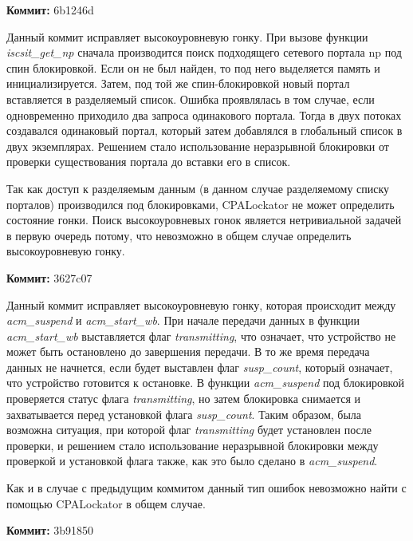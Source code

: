 \vspace{1cm}

\textbf{Коммит:} 6b1246d

Данный коммит исправляет высокоуровневую гонку.
При вызове функции \textit{iscsit\_get\_np} сначала производится поиск подходящего сетевого портала np под спин блокировкой.
Если он не был найден, то под него выделяется память и инициализируется.
Затем, под той же спин-блокировкой новый портал вставляется в разделяемый список.
Ошибка проявлялась в том случае, если одновременно приходило два запроса одинакового портала.
Тогда в двух потоках создавался одинаковый портал, который затем добавлялся в глобальный список в двух экземплярах.
Решением стало использование неразрывной блокировки от проверки существования портала до вставки его в список.

Так как доступ к разделяемым данным (в данном случае разделяемому списку порталов) производился под блокировками, CPALockator не может определить состояние гонки.
Поиск высокоуровневых гонок является нетривиальной задачей в первую очередь потому, что невозможно в общем случае определить высокоуровневую гонку.

\vspace{1cm}

\textbf{Коммит:} 3627c07

Данный коммит исправляет высокоуровневую гонку, которая происходит между \textit{acm\_suspend} и \textit{acm\_start\_wb}.
При начале передачи данных в функции \textit{acm\_start\_wb} выставляется флаг \textit{transmitting}, что означает, что устройство не может быть остановлено до завершения передачи.
В то же время передача данных не начнется, если будет выставлен флаг \textit{susp\_count}, который означает, что устройство готовится к остановке.
В функции \textit{acm\_suspend} под блокировкой проверяется статус флага \textit{transmitting}, но затем блокировка снимается и захватывается перед установкой флага \textit{susp\_count}.
Таким образом, была возможна ситуация, при которой флаг \textit{transmitting} будет установлен после проверки, и решением стало использование неразрывной блокировки между проверкой и установкой флага также, как это было сделано в \textit{acm\_suspend}.

Как и в случае с предыдущим коммитом данный тип ошибок невозможно найти с помощью CPALockator в общем случае.

\vspace{1cm}

\textbf{Коммит:} 3b91850


